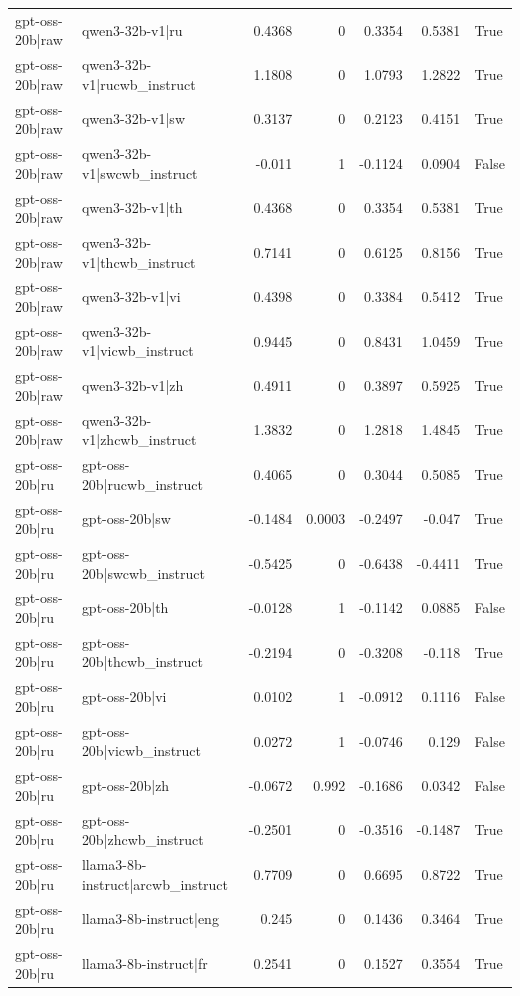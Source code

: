 \begin{table}
\begin{tabular}{l l r r r r l}
gpt-oss-20b|raw & qwen3-32b-v1|ru & 0.4368 & 0 & 0.3354 & 0.5381 & True \\
gpt-oss-20b|raw & qwen3-32b-v1|rucwb_instruct & 1.1808 & 0 & 1.0793 & 1.2822 & True \\
gpt-oss-20b|raw & qwen3-32b-v1|sw & 0.3137 & 0 & 0.2123 & 0.4151 & True \\
gpt-oss-20b|raw & qwen3-32b-v1|swcwb_instruct & -0.011 & 1 & -0.1124 & 0.0904 & False \\
gpt-oss-20b|raw & qwen3-32b-v1|th & 0.4368 & 0 & 0.3354 & 0.5381 & True \\
gpt-oss-20b|raw & qwen3-32b-v1|thcwb_instruct & 0.7141 & 0 & 0.6125 & 0.8156 & True \\
gpt-oss-20b|raw & qwen3-32b-v1|vi & 0.4398 & 0 & 0.3384 & 0.5412 & True \\
gpt-oss-20b|raw & qwen3-32b-v1|vicwb_instruct & 0.9445 & 0 & 0.8431 & 1.0459 & True \\
gpt-oss-20b|raw & qwen3-32b-v1|zh & 0.4911 & 0 & 0.3897 & 0.5925 & True \\
gpt-oss-20b|raw & qwen3-32b-v1|zhcwb_instruct & 1.3832 & 0 & 1.2818 & 1.4845 & True \\
gpt-oss-20b|ru & gpt-oss-20b|rucwb_instruct & 0.4065 & 0 & 0.3044 & 0.5085 & True \\
gpt-oss-20b|ru & gpt-oss-20b|sw & -0.1484 & 0.0003 & -0.2497 & -0.047 & True \\
gpt-oss-20b|ru & gpt-oss-20b|swcwb_instruct & -0.5425 & 0 & -0.6438 & -0.4411 & True \\
gpt-oss-20b|ru & gpt-oss-20b|th & -0.0128 & 1 & -0.1142 & 0.0885 & False \\
gpt-oss-20b|ru & gpt-oss-20b|thcwb_instruct & -0.2194 & 0 & -0.3208 & -0.118 & True \\
gpt-oss-20b|ru & gpt-oss-20b|vi & 0.0102 & 1 & -0.0912 & 0.1116 & False \\
gpt-oss-20b|ru & gpt-oss-20b|vicwb_instruct & 0.0272 & 1 & -0.0746 & 0.129 & False \\
gpt-oss-20b|ru & gpt-oss-20b|zh & -0.0672 & 0.992 & -0.1686 & 0.0342 & False \\
gpt-oss-20b|ru & gpt-oss-20b|zhcwb_instruct & -0.2501 & 0 & -0.3516 & -0.1487 & True \\
gpt-oss-20b|ru & llama3-8b-instruct|arcwb_instruct & 0.7709 & 0 & 0.6695 & 0.8722 & True \\
gpt-oss-20b|ru & llama3-8b-instruct|eng & 0.245 & 0 & 0.1436 & 0.3464 & True \\
gpt-oss-20b|ru & llama3-8b-instruct|fr & 0.2541 & 0 & 0.1527 & 0.3554 & True \\

\end{tabular}
\end{table}

